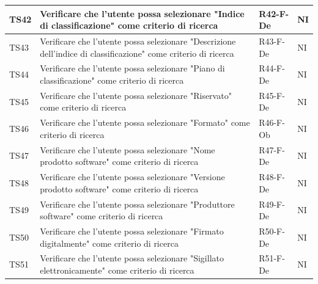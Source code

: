 \documentclass[a4paper,12pt]{article}
\begin{document}
\begin{longtable}{|M{1.2cm}|M{6.3cm}|M{2.5cm}|M{1.5cm}|}
                TS42 & Verificare che l'utente possa selezionare "Indice di classificazione" come criterio di ricerca & R42-F-De & NI \\
                \hline
                
                TS43 & Verificare che l'utente possa selezionare "Descrizione dell'indice di classificazione" come criterio di ricerca & R43-F-De & NI \\
                \hline

                TS44 & Verificare che l'utente possa selezionare "Piano di classificazione" come criterio di ricerca & R44-F-De & NI \\
                \hline
            
                TS45 & Verificare che l'utente possa selezionare "Riservato" come criterio di ricerca & R45-F-De & NI \\
                \hline
                
                TS46 & Verificare che l'utente possa selezionare "Formato" come criterio di ricerca & R46-F-Ob & NI \\
                \hline
                
                TS47 & Verificare che l'utente possa selezionare "Nome prodotto software" come criterio di ricerca & R47-F-De & NI \\
                \hline
                                
                TS48 & Verificare che l'utente possa selezionare "Versione prodotto software" come criterio di ricerca & R48-F-De & NI \\
                \hline
                                
                TS49 & Verificare che l'utente possa selezionare "Produttore software" come criterio di ricerca & R49-F-De & NI \\
                \hline
                                
                TS50 & Verificare che l'utente possa selezionare "Firmato digitalmente" come criterio di ricerca & R50-F-De & NI \\
                \hline
                                
                TS51 & Verificare che l'utente possa selezionare "Sigillato elettronicamente" come criterio di ricerca & R51-F-De & NI \\
                \hline
                                

\end{longtable}
\end{document}
